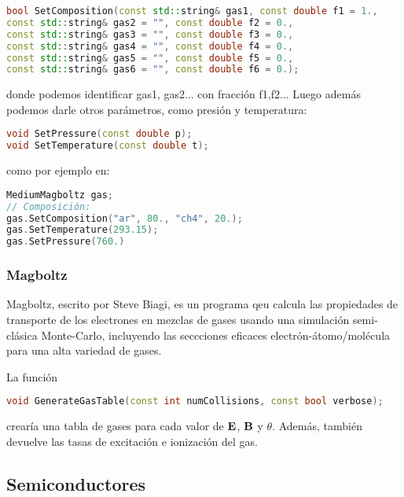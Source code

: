 \begin{lstlisting}[language=C++,style=c++]
bool SetComposition(const std::string& gas1, const double f1 = 1.,
const std::string& gas2 = "", const double f2 = 0.,
const std::string& gas3 = "", const double f3 = 0.,
const std::string& gas4 = "", const double f4 = 0.,
const std::string& gas5 = "", const double f5 = 0.,
const std::string& gas6 = "", const double f6 = 0.);
\end{lstlisting}
\vspace*{0.7em}
donde podemos identificar gas1, gas2... con fracción f1,f2... Luego además podemos darle otros parámetros, como presión y temperatura: 
\begin{lstlisting}[language=C++,style=c++]
void SetPressure(const double p);
void SetTemperature(const double t);
\end{lstlisting}
\vspace*{0.7em}
como por ejemplo en: \\
\begin{lstlisting}[language=C++,style=c++]
MediumMagboltz gas;
// Composición: 
gas.SetComposition("ar", 80., "ch4", 20.);
gas.SetTemperature(293.15);
gas.SetPressure(760.)
\end{lstlisting}
\vspace*{0.7em}

\subsubsection{Magboltz}

Magboltz, escrito por Steve Biagi, es un programa qeu calcula las propiedades de transporte de los electrones en mezclas de gases usando una simulación semi-clásica Monte-Carlo, incluyendo las seccciones eficaces electrón-átomo/molécula para una alta variedad de gases. 

La función \\
\begin{lstlisting}[language=C++,style=c++]
void GenerateGasTable(const int numCollisions, const bool verbose);
\end{lstlisting}
\vspace*{0.7em}
crearía una tabla de gases para cada valor de $\mathbf{E}$, $\mathbf{B}$ y $\theta$. Además, también devuelve las tasas de excitación e ionización del gas. 

\subsection{Semiconductores}


